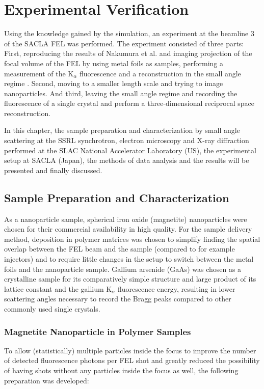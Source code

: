 \chapter{Experimental Verification}
\label{chap:experiment}

Using the knowledge gained by the simulation, an experiment at the beamline 3 of the SACLA FEL was performed. The experiment consisted of three parts: First, reproducing the results of Nakumura et al. and imaging projection of the focal volume of the FEL by using metal foils as samples, performing a measurement of the K$_\alpha$  fluorescence and a reconstruction in the small angle regime \cite{nakumura2020}.  Second, moving to a smaller length scale and trying to image nanoparticles. And third, leaving the small angle regime and recording the fluorescence of a single crystal and perform a three-dimensional reciprocal space reconstruction. 

In this chapter, the sample preparation and characterization by small angle scattering at the SSRL synchrotron, electron microscopy and X-ray diffraction performed at the SLAC National Accelerator  Laboratory (US), the experimental setup at SACLA (Japan), the methods of data analysis and the results will be presented and finally discussed.

\section{Sample Preparation and Characterization}
As a nanoparticle sample, spherical iron oxide  (magnetite) nanoparticles were chosen for their commercial availability in high quality. For the sample delivery method, deposition in polymer matrices was chosen to simplify finding the spatial overlap between the FEL beam and the sample (compared to for example injectors) and to require little changes in the setup to switch between the metal foils and the nanoparticle sample. 
Gallium arsenide (GaAs) was chosen as a crystalline sample for its comparatively simple structure and large product of its lattice constant and the gallium K${_\alpha}$ fluorescence energy, resulting in lower scattering angles necessary to record the Bragg peaks compared to other commonly used single crystals. 

\subsection{Magnetite Nanoparticle in Polymer Samples}
To allow (statistically) multiple particles inside the focus to improve the number of detected fluorescence photons per FEL shot and greatly reduced the possibility of having shots without any particles inside the focus as well, the following preparation was developed:

